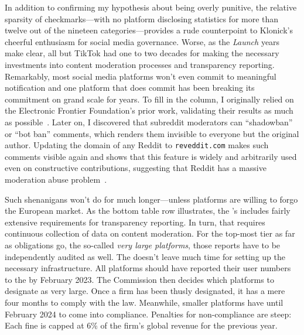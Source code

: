 In addition to confirming my hypothesis about being overly punitive, the
relative sparsity of checkmarks---with no platform disclosing statistics for
more than twelve out of the nineteen categories---provides a rude counterpoint
to Klonick's cheerful enthusiasm for social media governance. Worse, as the
\emph{Launch} years make clear, all but TikTok had one to two decades for making
the necessary investments into content moderation processes and transparency
reporting. Remarkably, most social media platforms won't even commit to
meaningful notification and one platform that does commit has been breaking its
commitment on grand scale for years.  To fill in the column, I originally relied
on the Electronic Frontier Foundation's prior work, validating their results as
much as possible~\cite{CrockerGebhartea2019}. Later on, I discovered that
subreddit moderators can ``shadowban'' or ``bot ban'' comments, which renders
them invisible to everyone but the original author. Updating the domain of any
Reddit  to \texttt{reveddit.com} makes such comments visible again and
shows that this feature is widely and arbitrarily used even on constructive
contributions, suggesting that Reddit has a massive moderation abuse
problem~\cite{Hawkins2023}.

Such shenanigans won't do for much longer---unless platforms are willing to
forgo the European market. As the bottom table row illustrates, the 's 
includes fairly extensive requirements for transparency reporting. In turn, that
requires continuous collection of data on content moderation. For the top-most
tier as far as obligations go, the so-called \emph{very large platforms}, those
reports have to be independently audited as well. The  doesn't leave much
time for setting up the necessary infrastructure. All platforms should have
reported their user numbers to the  by February 2023. The Commission then
decides which platforms to designate as very large. Once a firm has been thusly
designated, it has a mere four months to comply with the law. Meanwhile, smaller
platforms have until February 2024 to come into compliance. Penalties for
non-compliance are steep: Each fine is capped at 6\% of the firm's global
revenue for the previous year.

